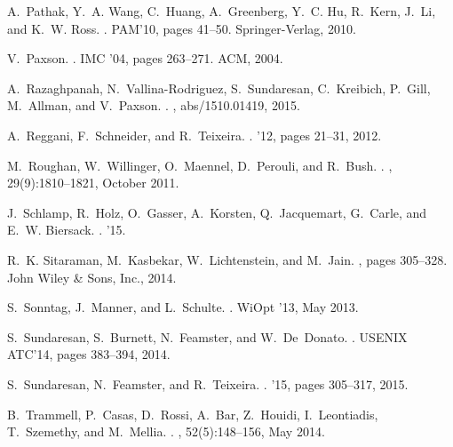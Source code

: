 \documentclass{sigcomm-alternate}
\begin{document}
\begin{thebibliography}{10}
A.~Pathak, Y.~A. Wang, C.~Huang, A.~Greenberg, Y.~C. Hu, R.~Kern, J.~Li, and
  K.~W. Ross.
.
\newblock PAM'10, pages 41--50. Springer-Verlag, 2010.

V.~Paxson.
.
\newblock IMC '04, pages 263--271. ACM, 2004.

A.~Razaghpanah, N.~Vallina{-}Rodriguez, S.~Sundaresan, C.~Kreibich, P.~Gill,
  M.~Allman, and V.~Paxson.
.
, abs/1510.01419, 2015.

A.~Reggani, F.~Schneider, and R.~Teixeira.
.
 '12, pages 21--31, 2012.

M.~Roughan, W.~Willinger, O.~Maennel, D.~Perouli, and R.~Bush.
.
, 29(9):1810--1821, October 2011.

J.~Schlamp, R.~Holz, O.~Gasser, A.~Korsten, Q.~Jacquemart, G.~Carle, and E.~W.
  Biersack.
.
 '15.

R.~K. Sitaraman, M.~Kasbekar, W.~Lichtenstein, and M.~Jain.
, pages 305--328.
\newblock John Wiley \& Sons, Inc., 2014.

S.~Sonntag, J.~Manner, and L.~Schulte.
.
\newblock WiOpt '13, May 2013.

S.~Sundaresan, S.~Burnett, N.~Feamster, and W.~De~Donato.
.
\newblock USENIX ATC'14, pages 383--394, 2014.

S.~Sundaresan, N.~Feamster, and R.~Teixeira.
.
 '15, pages 305--317, 2015.

B.~Trammell, P.~Casas, D.~Rossi, A.~Bar, Z.~Houidi, I.~Leontiadis, T.~Szemethy,
  and M.~Mellia.
.
, 52(5):148--156, May 2014.


\end{thebibliography}
\end{document}

